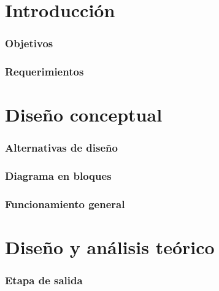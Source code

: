\documentclass[10pt,a4paper]{article}
\begin{document}
		
	\setcounter{page}{1}

	\part{Introducción}\label{part:intro}

		\section{Objetivos}\label{sec:obj}
			

		\section{Requerimientos}\label{sec:req}
			

	\part{Diseño conceptual}\label{part:concept}

		\section{Alternativas de diseño}\label{sec:alt}
			

		\section{Diagrama en bloques}\label{sec:bloques}
			

		\section{Funcionamiento general}\label{sec:func_gral} %
			

	\part{Diseño y análisis teórico}\label{part:teo}

		\section{Etapa de salida}
			
\end{document}
